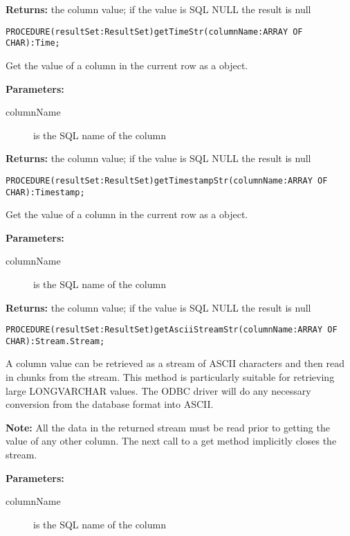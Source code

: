      {\bf Returns: } 
          the column value; if the value is SQL NULL the result is null 


\verb'PROCEDURE(resultSet:ResultSet)getTimeStr(columnName:ARRAY OF CHAR):Time;'

     Get the value of a column in the current row as a  object. 

     {\bf Parameters: } 
\begin{description}
\item[columnName] is the SQL name of the column 
\end{description}

     {\bf Returns: } 
          the column value; if the value is SQL NULL the result is null 


\verb'PROCEDURE(resultSet:ResultSet)getTimestampStr(columnName:ARRAY OF CHAR):Timestamp;'

     Get the value of a column in the current row as a  object. 

     {\bf Parameters: } 
\begin{description}
\item[columnName] is the SQL name of the column 
\end{description}

     {\bf Returns: } 
          the column value; if the value is SQL NULL the result is null 


\verb'PROCEDURE(resultSet:ResultSet)getAsciiStreamStr(columnName:ARRAY OF CHAR):Stream.Stream;'

     A column value can be retrieved as a stream of ASCII characters and then read in chunks from the stream. This method is particularly
     suitable for retrieving large LONGVARCHAR values. The ODBC driver will do any necessary conversion from the database format into
     ASCII. 

     {\bf Note: } All the data in the returned stream must be read prior to getting the value of any other column. The next call to a get method
     implicitly closes the stream. 

     {\bf Parameters: } 
\begin{description}
\item[columnName] is the SQL name of the column 
\end{description}

